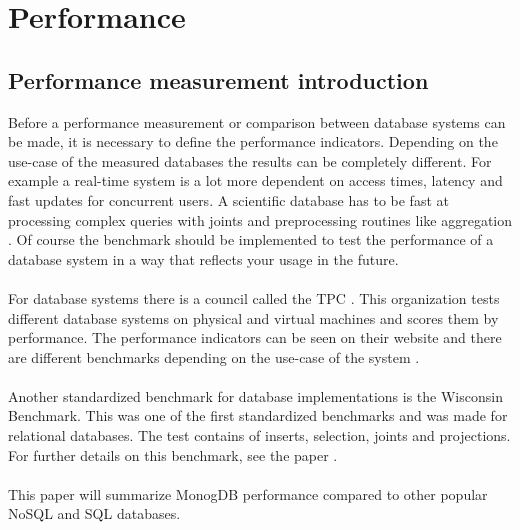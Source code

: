\section{Performance}
\subsection{Performance measurement introduction}
Before a performance measurement or comparison between database systems can be made, it is necessary to define the performance indicators. Depending on the use-case of the measured databases the results can be completely different. For example a real-time system is a lot more dependent on access times, latency and fast updates for concurrent users. A scientific database has to be fast at processing complex queries with joints and preprocessing routines like aggregation \cite{Neil_O}. Of course the benchmark should be implemented to test the performance of a database system in a way that reflects your usage in the future.
\\\\
For database systems there is a council called the TPC . This organization tests different database systems on physical and virtual machines and scores them by performance. The performance indicators can be seen on their website and there are different benchmarks depending on the use-case of the system \cite{_tpc.org.}. 
\\\\
Another standardized benchmark for database implementations is the Wisconsin Benchmark. This was one of the first standardized benchmarks and was made for relational databases. The test contains of inserts, selection, joints and projections. For further details on this benchmark, see the paper \cite{DeWitt_The_1991}.
\\\\
This paper will summarize MonogDB performance compared to other popular NoSQL and SQL  databases.

